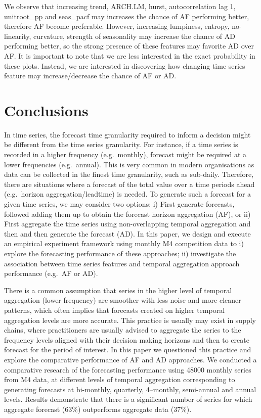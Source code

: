 \documentclass[preprint, 3p,
authoryear]{elsarticle} %
\begin{document}
We observe that increasing trend, ARCH.LM, hurst, autocorrelation lag 1,
unitroot\_pp and seas\_pacf may increases the chance of AF performing
better, therefore AF become preferable. However, increasing lumpiness,
entropy, no-linearity, curvature, strength of seasonality may increase
the chance of AD performing better, so the strong presence of these
features may favorite AD over AF. It is important to note that we are
less interested in the exact probability in these plots. Instead, we are
interested in discovering how changing time series feature may
increase/decrease the chance of AF or AD.

\hypertarget{con}{%
\section{Conclusions}\label{con}}

In time series, the forecast time granularity required to inform a
decision might be different from the time series granularity. For
instance, if a time series is recorded in a higher frequency
(e.g.~monthly), forecast might be required at a lower frequencies
(e.g.~annual). This is very common in modern organisations as data can
be collected in the finest time granularity, such as sub-daily.
Therefore, there are situations where a forecast of the total value over
a time periods ahead (e.g.~horizon aggregation/leadtime) is needed. To
generate such a forecast for a given time series, we may consider two
options: i) First generate forecasts, followed adding them up to obtain
the forecast horizon aggregation (AF), or ii) First aggregate the time
series using non-overlapping temporal aggregation and then and then
generate the forecast (AD). In this paper, we design and execute an
empirical experiment framework using monthly M4 competition data to i)
explore the forecasting performance of these approaches; ii) investigate
the association between time series features and temporal aggregation
approach performance (e.g.~AF or AD).

There is a common assumption that series in the higher level of temporal
aggregation (lower frequency) are smoother with less noise and more
cleaner patterns, which often implies that forecasts created on higher
temporal aggregation levels are more accurate. This practice is usually
may exist in supply chains, where practitioners are usually advised to
aggregate the series to the frequency levels aligned with their decision
making horizons and then to create forecast for the period of interest.
In this paper we questioned this practice and explore the comparative
performance of AF and AD approaches. We conducted a comparative research
of the forecasting performance using 48000 monthly series from M4 data,
at different levels of temporal aggregation corresponding to generating
forecasts at bi-monthly, quarterly, 4--monthly, semi-annual and annual
levels. Results demonstrate that there is a significant number of series
for which aggregate forecast (63\%) outperforms aggregate data (37\%).
\end{document}
